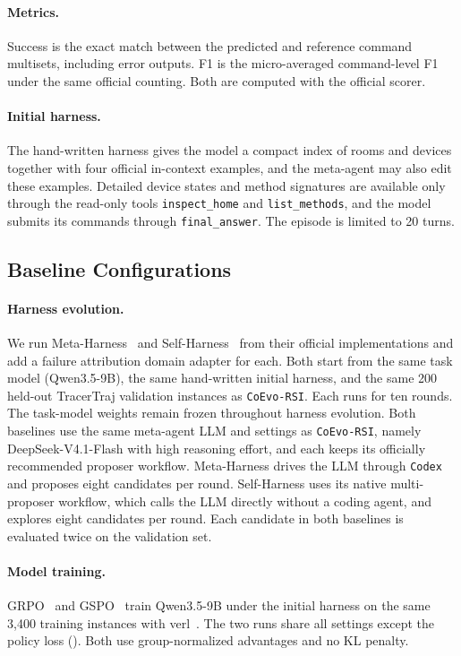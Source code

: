 \documentclass[11pt,a4paper]{article}
\newcommand{\ourmethod}{\texttt{CoEvo-RSI}}
\begin{document}
\paragraph{Metrics.}
Success is the exact match between the predicted and reference command multisets, including error outputs. F1 is the micro-averaged command-level F1 under the same official counting. Both are computed with the official scorer.

\paragraph{Initial harness.}
The hand-written harness gives the model a compact index of rooms and devices together with four official in-context examples, and the meta-agent may also edit these examples. Detailed device states and method signatures are available only through the read-only tools \texttt{inspect\_home} and \texttt{list\_methods}, and the model submits its commands through \texttt{final\_answer}. The episode is limited to 20 turns.

\subsection{Baseline Configurations}
\label{app:baselines}

\paragraph{Harness evolution.}
We run Meta-Harness~\citep{lee2026metaharness} and Self-Harness~\citep{zhang2026selfharness} from their official implementations and add a failure attribution domain adapter for each. Both start from the same task model (Qwen3.5-9B), the same hand-written initial harness, and the same 200 held-out TracerTraj validation instances as \ourmethod{}. Each runs for ten rounds. The task-model weights remain frozen throughout harness evolution. Both baselines use the same meta-agent LLM and settings as \ourmethod{}, namely DeepSeek-V4.1-Flash with high reasoning effort, and each keeps its officially recommended proposer workflow. Meta-Harness drives the LLM through \texttt{Codex} and proposes eight candidates per round. Self-Harness uses its native multi-proposer workflow, which calls the LLM directly without a coding agent, and explores eight candidates per round. Each candidate in both baselines is evaluated twice on the validation set.

\paragraph{Model training.}
GRPO~\citep{shao2024grpo} and GSPO~\citep{zheng2025gspo} train Qwen3.5-9B under the initial harness on the same 3,400 training instances with verl~\citep{sheng2024hybridflow}. The two runs share all settings except the policy loss (). Both use group-normalized advantages and no KL penalty.
\end{document}
